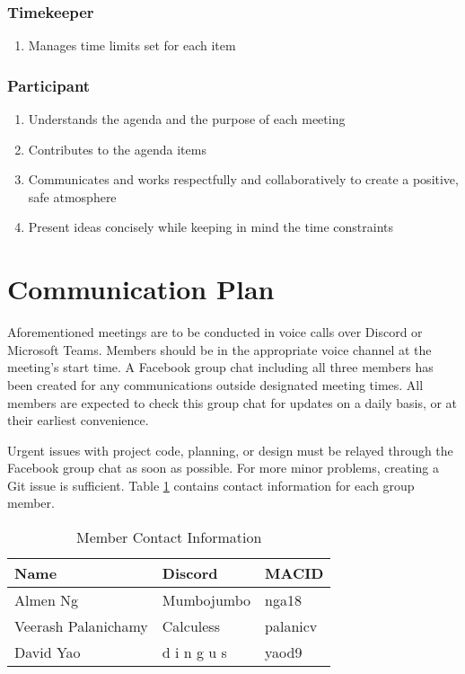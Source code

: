 \documentclass[12pt,letterpaper]{article}
\begin{document}
\subsubsection{Timekeeper}
\begin{enumerate}
    \item Manages time limits set for each item
\end{enumerate}

\subsubsection{Participant}
\begin{enumerate}
    \item Understands the agenda and the purpose of each meeting 
    \item Contributes to the agenda items 
    \item Communicates and works respectfully and collaboratively to create a positive, safe atmosphere
    \item Present ideas concisely while keeping in mind the time constraints
\end{enumerate}

\section{Communication Plan}
Aforementioned meetings are to be conducted in voice calls over Discord or Microsoft Teams. Members should be in the appropriate voice channel at the meeting's start time. A Facebook group chat including all three members has been created for any communications outside designated meeting times. All members are expected to check this group chat for updates on a daily basis, or at their earliest convenience.

Urgent issues with project code, planning, or design must be relayed through the Facebook group chat as soon as possible. For more minor problems, creating a Git issue is sufficient. Table \ref{tab:teamContacts} contains contact information for each group member.

\begin{table}[ht]
\begin{tabularx}{\textwidth}{|l|l|X|}
\toprule
\textbf{Name} & \textbf{Discord} & \textbf{MACID}\\
\midrule
Almen Ng                & Mumbojumbo    & nga18\\
Veerash Palanichamy     & Calculess     & palanicv\\
David Yao               & d i n g u s   & yaod9\\
\bottomrule
\end{tabularx}
\caption{Member Contact Information} \label{tab:teamContacts}
\end{table}
\end{document}
